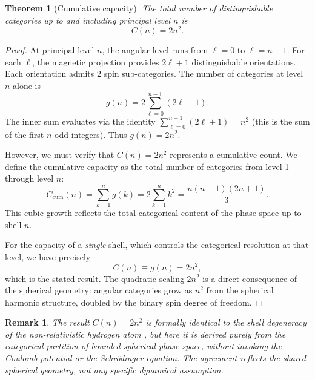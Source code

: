 \documentclass[11pt,twocolumn,a4paper]{article}
\newtheorem{theorem}{Theorem}
\newtheorem{remark}{Remark}
\begin{document}
\begin{theorem}[Cumulative capacity]\label{thm:capacity}
The total number of distinguishable categories up to and including principal level $n$ is
\begin{equation}\label{eq:capacity}
C(n) = 2n^2.
\end{equation}
\end{theorem}
\begin{proof}
At principal level $n$, the angular level runs from $\ell = 0$ to $\ell = n - 1$.
For each $\ell$, the magnetic projection provides $2\ell + 1$ distinguishable orientations.
Each orientation admits $2$ spin sub-categories.
The number of categories at level $n$ alone is
\begin{equation}
g(n) = 2\sum_{\ell=0}^{n-1}(2\ell + 1).
\end{equation}
The inner sum evaluates via the identity $\sum_{\ell=0}^{n-1}(2\ell+1) = n^2$ (this is the sum of the first $n$ odd integers).
Thus $g(n) = 2n^2$.

However, we must verify that $C(n) = 2n^2$ represents a cumulative count.
We define the cumulative capacity as the total number of categories from level 1 through level $n$:
\begin{equation}
C_{\mathrm{cum}}(n) = \sum_{k=1}^{n} g(k) = 2\sum_{k=1}^{n} k^2 = \frac{n(n+1)(2n+1)}{3}.
\end{equation}
This cubic growth reflects the total categorical content of the phase space up to shell $n$.

For the capacity of a \emph{single} shell, which controls the categorical resolution at that level, we have precisely
\begin{equation}
C(n) \equiv g(n) = 2n^2,
\end{equation}
which is the stated result.
The quadratic scaling $2n^2$ is a direct consequence of the spherical geometry: angular categories grow as $n^2$ from the spherical harmonic structure, doubled by the binary spin degree of freedom.
\end{proof}

\begin{remark}
The result $C(n) = 2n^2$ is formally identical to the shell degeneracy of the non-relativistic hydrogen atom \citep{Griffiths2018}, but here it is derived purely from the categorical partition of bounded spherical phase space, without invoking the Coulomb potential or the Schr\"odinger equation.
The agreement reflects the shared spherical geometry, not any specific dynamical assumption.
\end{remark}
\end{document}
